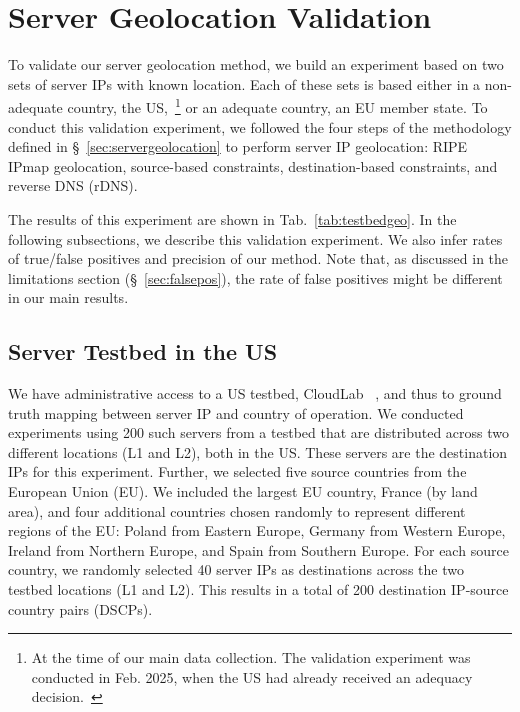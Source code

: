 \section{Server Geolocation Validation}
\label{sec:testbed}

To validate our server geolocation method, we build an experiment 
based on two sets of server IPs with known location.
Each of these sets is based either in a non-adequate country, the 
US,~\footnote{At the time of our main data collection. The validation experiment 
was conducted in Feb. 2025, when the US had already received an adequacy decision.~\cite{latham}}
or an adequate country, an EU member state.
To conduct this validation experiment, we followed the four steps 
of the methodology defined in \S~\ref{sec:servergeolocation} to perform 
server IP geolocation: RIPE IPmap geolocation, source-based constraints, 
destination-based constraints, and reverse DNS (rDNS).

The results of this experiment are shown in Tab.~\ref{tab:testbedgeo}.
In the following subsections, we describe this validation experiment.
We also infer rates of true/false positives and precision of our method.
Note that, as discussed in the limitations section (\S~\ref{sec:falsepos}), the 
rate of false positives might be different in our main results.




\subsection{Server Testbed in the US}
We have administrative access 
to a US testbed, CloudLab ~\cite{CloudLab}, and thus to ground truth mapping between server IP and country of operation. 
We conducted experiments using 200 such servers from a testbed that are
distributed across two different locations (L1 and L2), both in the US.
These servers are the destination IPs for this experiment. 
Further, we selected five source countries from 
the European Union (EU). We included the largest EU country, France (by land area), 
and four additional countries chosen randomly to represent different regions of the EU: 
Poland from Eastern Europe, Germany from Western Europe, Ireland from Northern Europe, 
and Spain from Southern Europe.
For each source country, we randomly selected 40 server IPs as destinations across 
the two testbed locations (L1 and L2). This results in a total of 200 destination IP-source
country pairs (DSCPs). 


